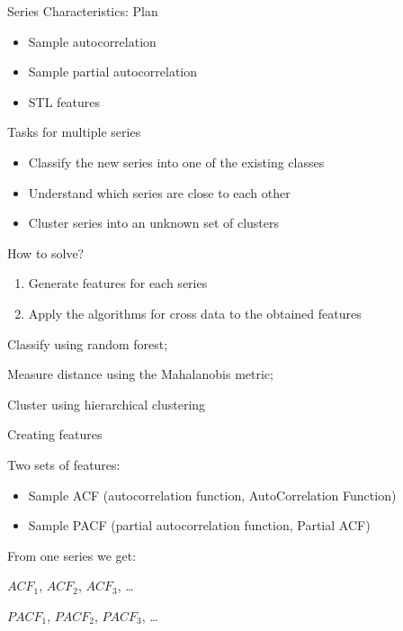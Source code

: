 
\begin{frame} %
	
	
\end{frame}



\begin{frame}{Series Characteristics: Plan}
	\begin{itemize}[<+->]
		\item Sample autocorrelation
		\item Sample partial autocorrelation
		\item STL features
	\end{itemize}
	
\end{frame}

\begin{frame}{Tasks for multiple series}
	\begin{itemize}
		\item Classify the new series into one of the existing classes
		\item Understand which series are close to each other
		\item Cluster series into an unknown set of clusters
	\end{itemize}
	\pause
	\alert{How to solve?}
	\begin{enumerate}[<+->]
		\item Generate \alert{features} for each series
		\item Apply the algorithms for cross data to the obtained features
	\end{enumerate}
	\pause
	Classify using random forest;
	
	Measure distance using the Mahalanobis metric;
	
	Cluster using hierarchical clustering
	
\end{frame}


\begin{frame}{Creating features}
	
	Two \alert{sets} of features:
	\begin{itemize}[<+->]
		\item Sample ACF (\alert{autocorrelation function}, AutoCorrelation Function)
		\item Sample PACF (\alert{partial} autocorrelation function, Partial ACF)
	\end{itemize}
	
	\pause
	From \alert{one} series we get:
	
	$ACF_1$, $ACF_2$, $ACF_3$, \ldots
	
	$PACF_1$, $PACF_2$, $PACF_3$, \ldots
\end{frame}


